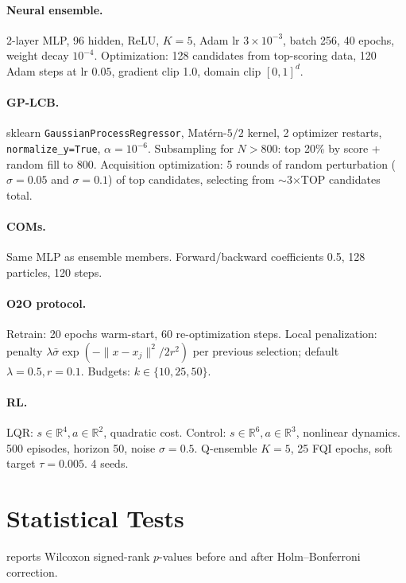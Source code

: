 \documentclass{article}
\theoremstyle{plain}
\theoremstyle{remark}
\newcommand{\Real}{\mathbb{R}}
\begin{document}
\paragraph{Neural ensemble.}
2-layer MLP, 96 hidden, ReLU, $K{=}5$, Adam lr $3{\times}10^{-3}$, batch 256, 40 epochs, weight decay $10^{-4}$.
Optimization: 128 candidates from top-scoring data, 120 Adam steps at lr $0.05$, gradient clip 1.0, domain clip $[0,1]^d$.

\paragraph{GP-LCB.}
sklearn \texttt{GaussianProcessRegressor}, Mat\'{e}rn-$5/2$ kernel, 2 optimizer restarts, \texttt{normalize\_y=True}, $\alpha{=}10^{-6}$.
Subsampling for $N > 800$: top 20\% by score + random fill to 800.
Acquisition optimization: 5 rounds of random perturbation ($\sigma{=}0.05$ and $\sigma{=}0.1$) of top candidates, selecting from $\sim$3$\times$TOP candidates total.

\paragraph{COMs.}
Same MLP as ensemble members. Forward/backward coefficients 0.5, 128 particles, 120 steps.

\paragraph{O2O protocol.}
Retrain: 20 epochs warm-start, 60 re-optimization steps.
Local penalization: penalty $\lambda \bar{\sigma} \exp(-\|x-x_j\|^2 / 2r^2)$ per previous selection; default $\lambda{=}0.5, r{=}0.1$.
Budgets: $k \in \{10, 25, 50\}$.

\paragraph{RL.}
LQR: $s \in \Real^4, a \in \Real^2$, quadratic cost.
Control: $s \in \Real^6, a \in \Real^3$, nonlinear dynamics.
500 episodes, horizon 50, noise $\sigma{=}0.5$.
Q-ensemble $K{=}5$, 25 FQI epochs, soft target $\tau{=}0.005$.
4 seeds.

\section{Statistical Tests}
\label{app:stats}

 reports Wilcoxon signed-rank $p$-values before and after Holm--Bonferroni correction.
\end{document}
